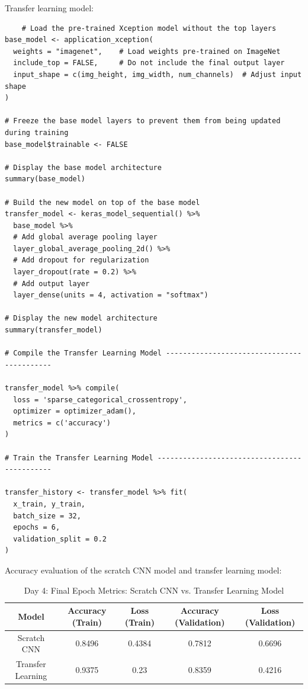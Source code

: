\documentclass[letterpaper,11pt]{article}
\begin{document}
Transfer learning model:

\begin{verbatim}
    # Load the pre-trained Xception model without the top layers
base_model <- application_xception(
  weights = "imagenet",    # Load weights pre-trained on ImageNet
  include_top = FALSE,     # Do not include the final output layer
  input_shape = c(img_height, img_width, num_channels)  # Adjust input shape
)

# Freeze the base model layers to prevent them from being updated during training
base_model$trainable <- FALSE

# Display the base model architecture
summary(base_model)

# Build the new model on top of the base model
transfer_model <- keras_model_sequential() %>%
  base_model %>%
  # Add global average pooling layer
  layer_global_average_pooling_2d() %>%
  # Add dropout for regularization
  layer_dropout(rate = 0.2) %>%
  # Add output layer
  layer_dense(units = 4, activation = "softmax")

# Display the new model architecture
summary(transfer_model)

# Compile the Transfer Learning Model -------------------------------------------

transfer_model %>% compile(
  loss = 'sparse_categorical_crossentropy',
  optimizer = optimizer_adam(),
  metrics = c('accuracy')
)

# Train the Transfer Learning Model ---------------------------------------------

transfer_history <- transfer_model %>% fit(
  x_train, y_train,
  batch_size = 32,
  epochs = 6, 
  validation_split = 0.2
)
\end{verbatim}

Accuracy evaluation of the scratch CNN model and transfer learning model:

\begin{table}[h!]
    \centering
    \begin{tabular}{|c|c|c|c|c|}
        \hline
        \textbf{Model} & \textbf{Accuracy (Train)} & \textbf{Loss (Train)} & \textbf{Accuracy (Validation)} & \textbf{Loss (Validation)} \\ \hline
        Scratch CNN & 0.8496 & 0.4384 & 0.7812 & 0.6696 \\ \hline
        Transfer Learning & 0.9375 & 0.23 & 0.8359 & 0.4216 \\ \hline
    \end{tabular}
    \caption{Day 4: Final Epoch Metrics: Scratch CNN vs. Transfer Learning Model}
    \label{tab:cnn_transfer}
\end{table}
\end{document}

